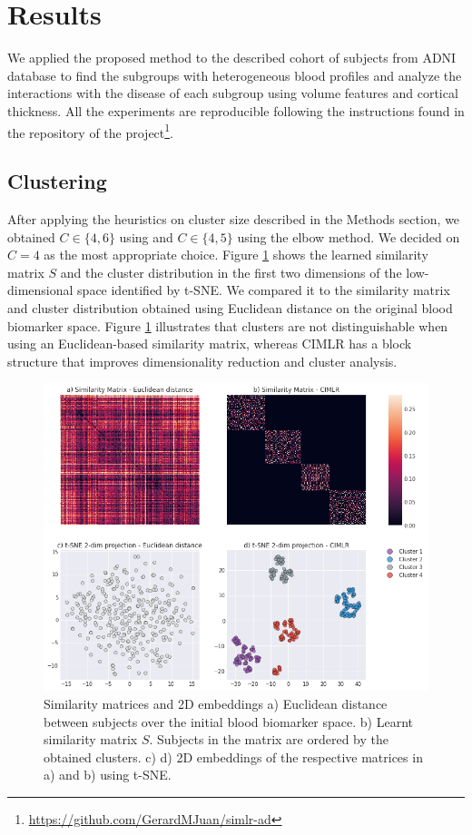 \section{Results}

We applied the proposed method to the described cohort of subjects from ADNI database to find the subgroups with heterogeneous blood profiles and analyze the interactions with the disease of each subgroup using volume features and cortical thickness. All the experiments are reproducible following the instructions found in the repository of the project\footnote{\url{https://github.com/GerardMJuan/simlr-ad}}.

\subsection{Clustering}

After applying the heuristics on cluster size described in the Methods section, we obtained $C\in\{4,6\}$ using  \cite{Zelnik-Manor} and $C\in\{4,5\}$ using the elbow method. We decided on $C=4$ as the most appropriate choice. Figure \ref{figclusters} shows the learned similarity matrix $S$ and the cluster distribution in the first two dimensions of the low-dimensional space identified by t-SNE. We compared it to the similarity matrix and cluster distribution obtained using Euclidean distance on the original blood biomarker space. Figure \ref{figclusters} illustrates that clusters are not distinguishable when using an Euclidean-based similarity matrix, whereas CIMLR has a block structure that improves dimensionality reduction and cluster analysis. \\

\begin{figure}[!htbp]
  \centering
\includegraphics[width=1.0\textwidth]{figures/cimlr/cluster_results_full.png}
\caption[Similarity matrices and 2D embeddings.]{Similarity matrices and 2D embeddings a) Euclidean distance between subjects over the initial blood biomarker space. b) Learnt similarity matrix $S$. Subjects in the matrix are ordered by the obtained clusters. c) d) 2D embeddings of the respective matrices in a) and b) using t-SNE.}
\label{figclusters}
\end{figure}


